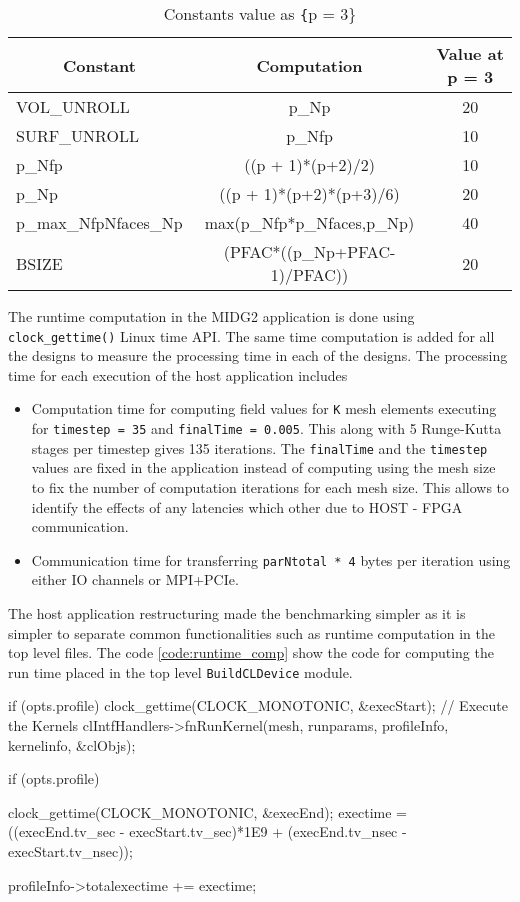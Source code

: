 \begin{table}[ht]
    \centering
    \caption{Constants value as \texttt\{p = 3\}}
    \label{tab:constants}
    \begin{tabular}{lcc}
    \multicolumn{1}{c}{\textbf{Constant}} & \multicolumn{1}{c}{\textbf{Computation}} & \multicolumn{1}{c}{\textbf{Value at p = 3}} \\
    \hline
    VOL\_UNROLL & p\_Np & 20 \\
    SURF\_UNROLL & p\_Nfp & 10\\
    p\_Nfp & ((p + 1)*(p+2)/2) & 10 \\
    p\_Np & ((p + 1)*(p+2)*(p+3)/6) & 20 \\
    p\_max\_NfpNfaces\_Np & max(p\_Nfp*p\_Nfaces,p\_Np) & 40 \\
    BSIZE & (PFAC*((p\_Np+PFAC-1)/PFAC)) & 20 \\
    \hline
    \end{tabular}%
\end{table}

The runtime computation in the MIDG2 application is done using \texttt{clock\_gettime()}
Linux time API. The same time computation is added for all the designs to
measure the processing time in each of the designs. The processing time
for each execution of the host application includes
\begin{itemize}
\item Computation time for computing field values for \texttt{K} mesh elements
executing for \texttt{timestep = 35} and \texttt{finalTime = 0.005}. This along
with 5 Runge-Kutta stages per timestep gives 135 iterations. The \texttt{finalTime}
and the \texttt{timestep} values are fixed in the application instead of
computing using the mesh size to fix the number of computation iterations for each
mesh size. This allows to identify the effects of any latencies which other
due to HOST - FPGA communication.
\item Communication time for transferring \texttt{parNtotal * 4} bytes per iteration
using either IO channels or MPI+PCIe.
\end{itemize}

The host application restructuring made the benchmarking simpler as it is
simpler to separate common functionalities such as runtime computation
in the top level files. The code \ref{code:runtime_comp} show the code
for computing the run time placed in the top level \texttt{BuildCLDevice}
module.
\begin{CppCode}[caption=Runtime computation code for the MIDG2 Designs
    using \texttt{clock\_gettime()}, frame=tlrb, label=code:runtime_comp]
if (opts.profile)
{
    clock_gettime(CLOCK_MONOTONIC, &execStart);
}
// Execute the Kernels
clIntfHandlers->fnRunKernel(mesh, runparams, profileInfo, kernelinfo, &clObjs);

if (opts.profile)
{
    clock_gettime(CLOCK_MONOTONIC, &execEnd);
    exectime = ((execEnd.tv_sec - execStart.tv_sec)*1E9
            + (execEnd.tv_nsec - execStart.tv_nsec));

    profileInfo->totalexectime += exectime;
}
\end{CppCode}

